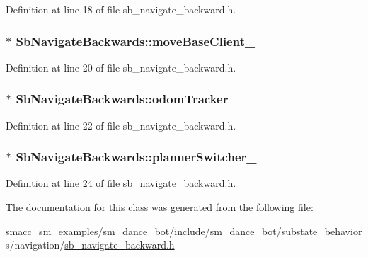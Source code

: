 Definition at line 18 of file sb\+\_\+navigate\+\_\+backward.\+h.

\subsubsection[{\texorpdfstring{move\+Base\+Client\+\_\+}{moveBaseClient_}}]{$\ast$ Sb\+Navigate\+Backwards\+::move\+Base\+Client\+\_\+}\hypertarget{classSbNavigateBackwards_a7e46b20eb07e60685a5b88b12b341fd8}{}\label{classSbNavigateBackwards_a7e46b20eb07e60685a5b88b12b341fd8}


Definition at line 20 of file sb\+\_\+navigate\+\_\+backward.\+h.

\subsubsection[{\texorpdfstring{odom\+Tracker\+\_\+}{odomTracker_}}]{$\ast$ Sb\+Navigate\+Backwards\+::odom\+Tracker\+\_\+}\hypertarget{classSbNavigateBackwards_a570fa48348a172b3db7bcb5f486017b1}{}\label{classSbNavigateBackwards_a570fa48348a172b3db7bcb5f486017b1}


Definition at line 22 of file sb\+\_\+navigate\+\_\+backward.\+h.

\subsubsection[{\texorpdfstring{planner\+Switcher\+\_\+}{plannerSwitcher_}}]{$\ast$ Sb\+Navigate\+Backwards\+::planner\+Switcher\+\_\+}\hypertarget{classSbNavigateBackwards_a941dc2026876a1d8c35818c6feac768a}{}\label{classSbNavigateBackwards_a941dc2026876a1d8c35818c6feac768a}


Definition at line 24 of file sb\+\_\+navigate\+\_\+backward.\+h.



The documentation for this class was generated from the following file\+:\begin{DoxyCompactItemize}
\item 
smacc\+\_\+sm\+\_\+examples/sm\+\_\+dance\+\_\+bot/include/sm\+\_\+dance\+\_\+bot/substate\+\_\+behaviors/navigation/\hyperlink{sb__navigate__backward_8h}{sb\+\_\+navigate\+\_\+backward.\+h}\end{DoxyCompactItemize}
